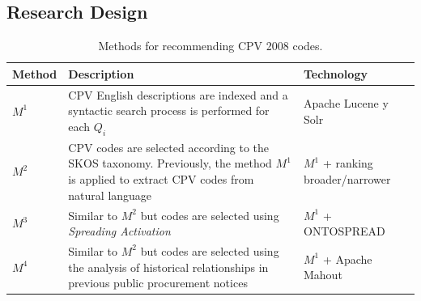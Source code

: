 \subsection{Research Design}


\begin{table}[!htb]
\renewcommand{\arraystretch}{1.3}
\begin{center}
\begin{tabular}[c]{|l|p{8.5cm}|p{4.5cm}|} 
\hline
\textbf{Method} &  \textbf{Description} &  \textbf{Technology} \\\hline
$M^1$ & CPV English descriptions are indexed and a syntactic search process is performed for each $Q_i$ & Apache Lucene y Solr \\ \hline
$M^2$ & CPV codes are selected according to the SKOS taxonomy. Previously, the method $M^1$ is applied to extract CPV codes from natural language & $M^1$ + ranking broader/narrower \\ \hline
$M^3$ & Similar to $M^2$ but codes are selected using \textit{Spreading Activation}& $M^1$ + ONTOSPREAD \\ \hline
$M^4$ & Similar to $M^2$ but codes are selected using the analysis of historical relationships in previous public procurement notices & $M^1$ + Apache Mahout \\ \hline
 \end{tabular}
  \caption{Methods for recommending CPV 2008 codes.}\label{methods-recommending}  
    \end{center}
\end{table}


% 
% 


